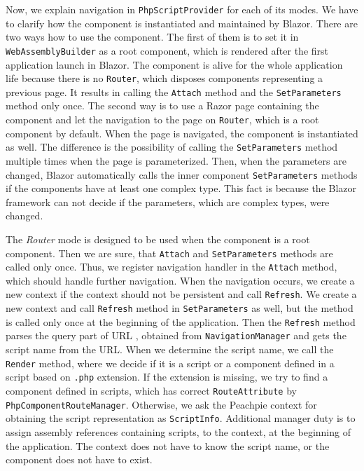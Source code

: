Now, we explain navigation in \texttt{PhpScriptProvider} for each of its modes.
We have to clarify how the component is instantiated and maintained by Blazor.
There are two ways how to use the component.
The first of them is to set it in \texttt{WebAssemblyBuilder} as a root component,
which is rendered after the first application launch in Blazor.
The component is alive for the whole application life because there is no \texttt{Router}, which disposes components representing a previous page. 
It results in calling the \texttt{Attach} method and the \texttt{SetParameters} method only once.
The second way is to use a Razor page containing the component and let the navigation to the page on \texttt{Router}, which is a root component by default.
When the page is navigated, the component is instantiated as well.
The difference is the possibility of calling the \texttt{SetParameters} method multiple times when the page is parameterized.
Then, when the parameters are changed, Blazor automatically calls the inner component \texttt{SetParameters} methods if the components have at least one complex type. 
This fact is because the Blazor framework can not decide if the parameters, which are complex types, were changed.
\par
The \textit{Router} mode is designed to be used when the component is a root component.
Then we are sure, that \texttt{Attach} and \texttt{SetParameters} methods are called only once.
Thus, we register navigation handler in the \texttt{Attach} method, which should handle further navigation.
When the navigation occurs, we create a new context if the context should not be persistent and call \texttt{Refresh}.
We create a new context and call \texttt{Refresh} method in \texttt{SetParameters} as well, but the method is called only once at the beginning of the application.
Then the \texttt{Refresh} method parses the query part of URL \cite{online:querryStrings}, obtained from \texttt{NavigationManager} and gets the script name from the URL.
When we determine the script name, we call the \texttt{Render} method, where we decide if it is a script or a component defined in a script based on \texttt{.php} extension.
If the extension is missing, we try to find a component defined in scripts, which has correct \texttt{RouteAttribute} by \texttt{PhpComponentRouteManager}.
Otherwise, we ask the Peachpie context for obtaining the script representation as \texttt{ScriptInfo}.
Additional manager duty is to assign assembly references containing scripts, to the context, at the beginning of the application.
The context does not have to know the script name, or the component does not have to exist. 
